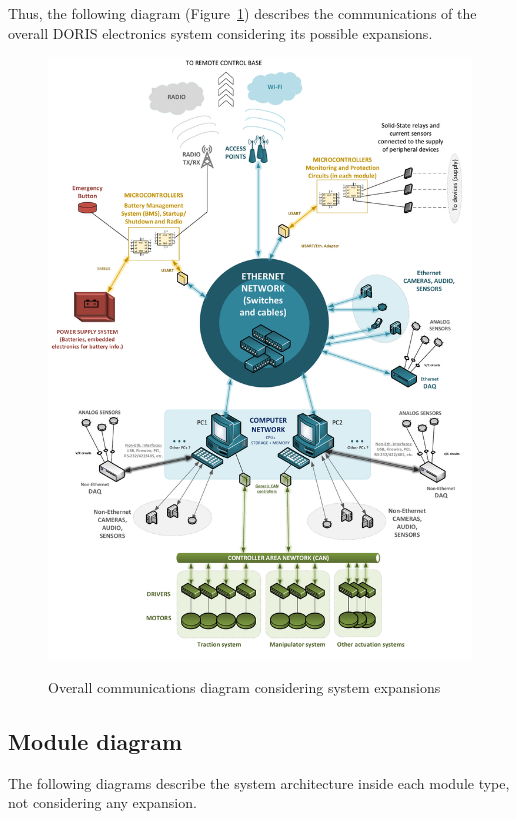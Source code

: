 Thus, the following diagram (Figure~\ref{FIG:EXPANSIONSCOMDIAGRAM}) describes the communications of the overall DORIS electronics system considering its possible expansions.
\begin{figure}
  \centering
  \includegraphics[angle=90,width=1\columnwidth]{figs/body01/FIGEXPANSIONSCOMDIAGRAM.pdf}\\
  \caption[Overall communications diagram considering system expansions]{Overall communications diagram considering system expansions}
  \label{FIG:EXPANSIONSCOMDIAGRAM}
\end{figure}

\subsection{Module diagram}
The following diagrams describe the system architecture inside each module type, not considering any expansion.

